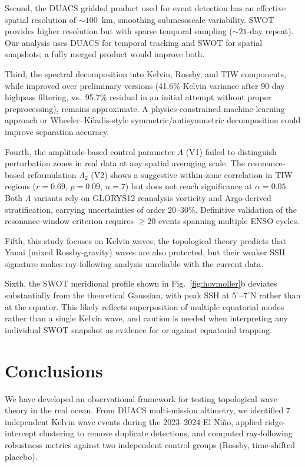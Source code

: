 \documentclass[11pt]{article}
\begin{document}
Second, the DUACS gridded product used for event detection has an effective spatial resolution of ${\sim}100$~km, smoothing submesoscale variability. SWOT provides higher resolution but with sparse temporal sampling (${\sim}21$-day repeat). Our analysis uses DUACS for temporal tracking and SWOT for spatial snapshots; a fully merged product would improve both.

Third, the spectral decomposition into Kelvin, Rossby, and TIW components, while improved over preliminary versions (41.6\% Kelvin variance after 90-day highpass filtering, vs.\ 95.7\% residual in an initial attempt without proper preprocessing), remains approximate. A physics-constrained machine-learning approach or Wheeler--Kiladis-style symmetric/antisymmetric decomposition could improve separation accuracy.

Fourth, the amplitude-based control parameter $\Lambda$ (V1) failed to distinguish perturbation zones in real data at any spatial averaging scale. The resonance-based reformulation $\Lambda_2$ (V2) shows a suggestive within-zone correlation in TIW regions ($r = 0.69$, $p = 0.09$, $n = 7$) but does not reach significance at $\alpha = 0.05$. Both $\Lambda$ variants rely on GLORYS12 reanalysis vorticity and Argo-derived stratification, carrying uncertainties of order 20--30\%. Definitive validation of the resonance-window criterion requires $\geq 20$ events spanning multiple ENSO cycles.

Fifth, this study focuses on Kelvin waves; the topological theory predicts that Yanai (mixed Rossby-gravity) waves are also protected, but their weaker SSH signature makes ray-following analysis unreliable with the current data.

Sixth, the SWOT meridional profile shown in Fig.~\ref{fig:hovmoller}b deviates substantially from the theoretical Gaussian, with peak SSH at $5^\circ$--$7^\circ$N rather than at the equator. This likely reflects superposition of multiple equatorial modes rather than a single Kelvin wave, and caution is needed when interpreting any individual SWOT snapshot as evidence for or against equatorial trapping.

\section{Conclusions}
\label{sec:conclusions}

We have developed an observational framework for testing topological wave theory in the real ocean. From DUACS multi-mission altimetry, we identified 7 independent Kelvin wave events during the 2023--2024 El Ni\~no, applied ridge-intercept clustering to remove duplicate detections, and computed ray-following robustness metrics against two independent control groups (Rossby, time-shifted placebo).
\end{document}
